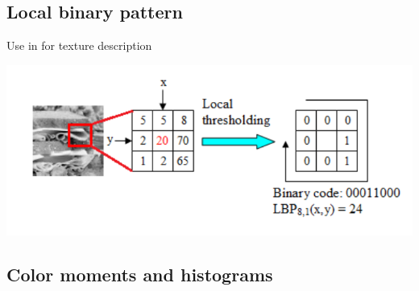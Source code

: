 \documentclass[aspectratio=169]{beamer}
\newenvironment{myframe}[1][t]{\begin{frame}[#1]{\secname}{\subsecname}}{\end{frame}}
\begin{document}
    \subsection{Local binary pattern}
    
    \begin{myframe}
        Use in \cite{Zong2010, Nguyen2014} for texture description
        
        \begin{center}
            \includegraphics[scale=0.55]{../img/lbp}
        \end{center}
    \end{myframe}
    
    \subsection{Color moments and histograms}
    
\end{document}
